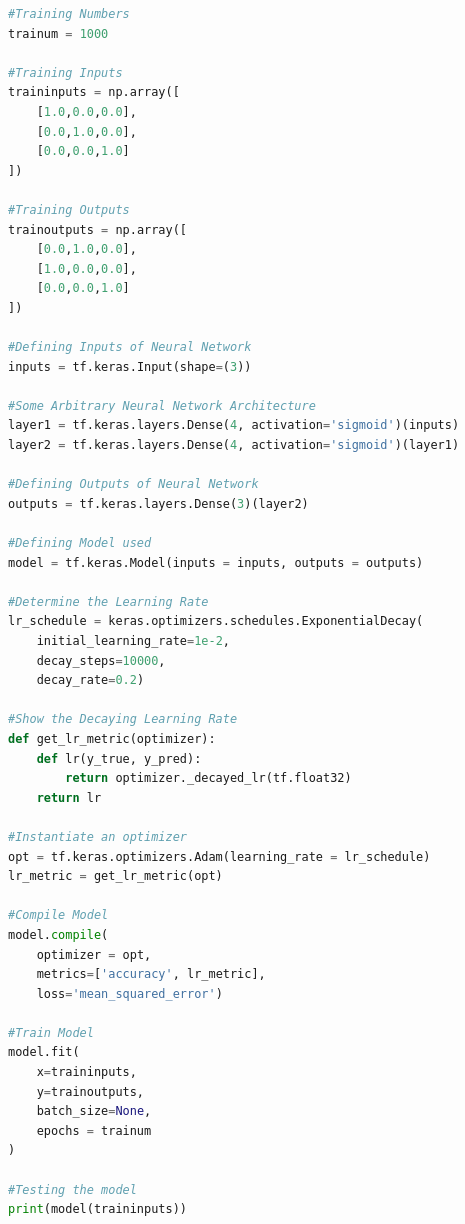 \documentclass[a4paper, 12pt]{report}
\begin{document}
\begin{center}
\begin{lstlisting}[language=python]
#Training Numbers
trainum = 1000

#Training Inputs
traininputs = np.array([
    [1.0,0.0,0.0],
    [0.0,1.0,0.0],
    [0.0,0.0,1.0]
])

#Training Outputs
trainoutputs = np.array([
    [0.0,1.0,0.0],
    [1.0,0.0,0.0],
    [0.0,0.0,1.0]
])

#Defining Inputs of Neural Network
inputs = tf.keras.Input(shape=(3))

#Some Arbitrary Neural Network Architecture
layer1 = tf.keras.layers.Dense(4, activation='sigmoid')(inputs)
layer2 = tf.keras.layers.Dense(4, activation='sigmoid')(layer1)

#Defining Outputs of Neural Network
outputs = tf.keras.layers.Dense(3)(layer2)

#Defining Model used
model = tf.keras.Model(inputs = inputs, outputs = outputs)

#Determine the Learning Rate
lr_schedule = keras.optimizers.schedules.ExponentialDecay(
    initial_learning_rate=1e-2,
    decay_steps=10000,
    decay_rate=0.2)

#Show the Decaying Learning Rate
def get_lr_metric(optimizer):
    def lr(y_true, y_pred):
        return optimizer._decayed_lr(tf.float32)
    return lr

#Instantiate an optimizer
opt = tf.keras.optimizers.Adam(learning_rate = lr_schedule)
lr_metric = get_lr_metric(opt)

#Compile Model
model.compile(
    optimizer = opt,
    metrics=['accuracy', lr_metric],
    loss='mean_squared_error')

#Train Model
model.fit(
    x=traininputs, 
    y=trainoutputs, 
    batch_size=None,
    epochs = trainum
)

#Testing the model
print(model(traininputs))


\end{lstlisting}
\end{center}
\end{document}

